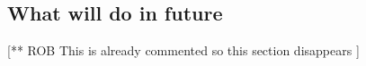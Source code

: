 



\subsection{What will do in future}
[** ROB This is already commented so this section disappears ]


